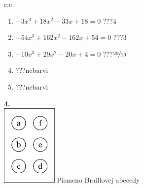 \documentclass[10pt]{report}
\begin{document}
\begin{tabular}{c:c}
\begin{minipage}[c][104.5mm][t]{0.5\linewidth}
\begin{center}
\begin{minipage}{0.79\linewidth}
\begin{center}
\begin{varwidth}{\linewidth}
\begin{enumerate}
\item $-3x^3+18x^2-33x+18=0$\quad \dotfill\; ???\;\dotfill \quad $4$
\item $-54x^3+162x^2-162x+54=0$\quad \dotfill\; ???\;\dotfill \quad $3$
\item $-10x^3+29x^2-20x+4=0$\quad \dotfill\; ???\;\dotfill \quad $\nicefrac{29}{10}$
\item \quad \dotfill\; ???\;\dotfill \quad nebarvi
\item \quad \dotfill\; ???\;\dotfill \quad nebarvi
\end{enumerate}
\end{varwidth}
\end{center}
\end{minipage}
\begin{minipage}{0.20\linewidth}
\begin{center}
{\Huge\bfseries 4.} \\[2mm]
\includegraphics[height=40mm]{../images/braille.png}
{\small Písmeno Braillovej abecedy}
\end{center}
\end{minipage}
\end{center}
\end{minipage}
%
\end{tabular}
\newpage
\thispagestyle{empty}
\end{document}

